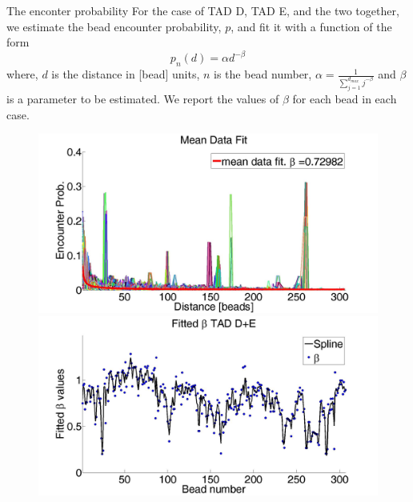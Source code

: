 \documentclass[8pt]{beamer}
\begin{document}
\begin{frame}{The enconter probability}
For the case of TAD D, TAD E, and the two together, we estimate the bead encounter probability, $p$, and fit it with a function of the form 
\begin{equation*}
p_n(d)=\alpha d^{-\beta}
\end{equation*}
where, $d$ is the distance in [bead] units, $n$ is the bead number, $\alpha=\frac{1}{\sum_{j=1}^{d_{max}}j^{-\beta}}$ and $\beta$ is a parameter to be estimated.
We report the values of $\beta$ for each bead in each case.
\begin{figure}[H]
\includegraphics[scale=0.1]{meanDataFitTADDAndE}
\includegraphics[scale=0.1]{fittedExpValuesWithSplineAverageTADDAndE}
\end{figure}
\end{frame}
\end{document}
